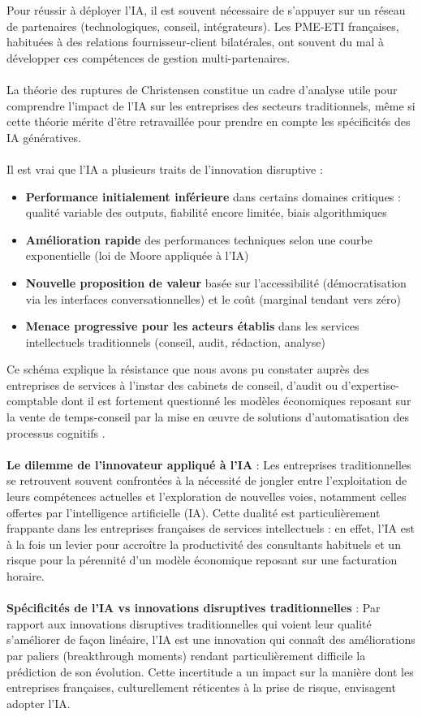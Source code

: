 Pour réussir à déployer l’IA, il est souvent nécessaire de s’appuyer sur un réseau de partenaires (technologiques, conseil, intégrateurs). Les PME-ETI françaises, habituées à des relations fournisseur-client bilatérales, ont souvent du mal à développer ces compétences de gestion multi-partenaires.
\\\\
La théorie des ruptures de Christensen constitue un cadre d’analyse utile pour comprendre l’impact de l’IA sur les entreprises des secteurs traditionnels, même si cette théorie mérite d’être retravaillée pour prendre en compte les spécificités des IA génératives.
\\\\
Il est vrai que l’IA a plusieurs traits de l’innovation disruptive :
\begin{itemize}
    \item \textbf{Performance initialement inférieure} dans certains domaines critiques : qualité variable des outputs, fiabilité encore limitée, biais algorithmiques
    \item \textbf{Amélioration rapide} des performances techniques selon une courbe exponentielle (loi de Moore appliquée à l'IA)
    \item \textbf{Nouvelle proposition de valeur} basée sur l'accessibilité (démocratisation via les interfaces conversationnelles) et le coût (marginal tendant vers zéro)
    \item \textbf{Menace progressive pour les acteurs établis} dans les services intellectuels traditionnels (conseil, audit, rédaction, analyse)
\end{itemize}
\medskip
Ce schéma explique la résistance que nous avons pu constater auprès des entreprises de services à l’instar des cabinets de conseil, d’audit ou d’expertise-comptable dont il est fortement questionné les modèles économiques reposant sur la vente de temps-conseil par la mise en œuvre de solutions d’automatisation des processus cognitifs \cite{syntec2024ai}.
\\\\
\textbf{Le dilemme de l'innovateur appliqué à l'IA} : Les entreprises traditionnelles se retrouvent souvent confrontées à la nécessité de jongler entre l’exploitation de leurs compétences actuelles et l’exploration de nouvelles voies, notamment celles offertes par l’intelligence artificielle (IA). Cette dualité est particulièrement frappante dans les entreprises françaises de services intellectuels : en effet, l’IA est à la fois un levier pour accroître la productivité des consultants habituels et un risque pour la pérennité d’un modèle économique reposant sur une facturation horaire.
\\\\
\textbf{Spécificités de l'IA vs innovations disruptives traditionnelles} : Par rapport aux innovations disruptives traditionnelles qui voient leur qualité s'améliorer de façon linéaire, l'IA est une innovation qui connaît des améliorations par paliers (breakthrough moments) rendant particulièrement difficile la prédiction de son évolution. Cette incertitude a un impact sur la manière dont les entreprises françaises, culturellement réticentes à la prise de risque, envisagent adopter l'IA.

